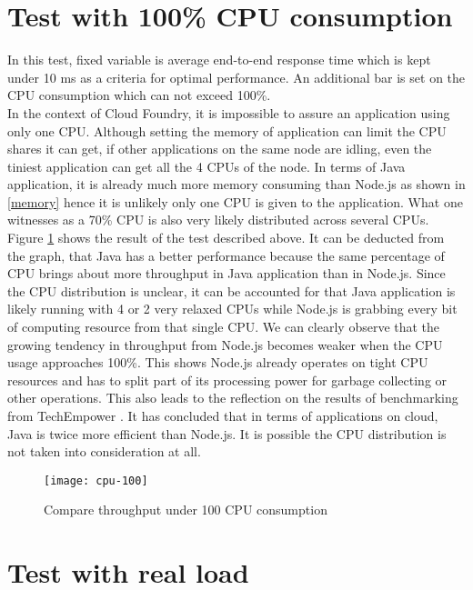 \section{Test with 100\% CPU consumption}
In this test, fixed variable is average end-to-end response time which is kept under 10 ms  as a criteria for optimal performance. An additional bar is set on the CPU consumption which can not exceed 100\%. \\
In the context of Cloud Foundry, it is impossible to assure an application using only one CPU. Although setting the memory of application can limit the CPU shares it can get, if other applications on the same node are idling, even the tiniest application can get all the 4 CPUs of the node. In terms of Java application, it is already much more memory consuming than Node.js as shown in \ref{memory} hence it is unlikely only one CPU is given to the application. What one witnesses as a 70\% CPU is also very likely distributed across several CPUs.\\
Figure \ref{cpu-100} shows the result of the test described above. It can be deducted from the graph, that Java has a better performance because the same percentage of CPU brings about more throughput in Java application than in Node.js. Since the CPU distribution is unclear, it can be accounted for that Java application is likely running with 4 or 2 very relaxed CPUs while Node.js is grabbing every bit of computing resource from that single CPU. We can clearly observe that the growing tendency in throughput from Node.js becomes weaker when the CPU usage approaches 100\%. This shows Node.js already operates on tight CPU resources and has to split part of its processing power for garbage collecting or other operations. This also leads to the reflection on the results of benchmarking from TechEmpower \citep{Benchmark}. It has concluded that in terms of applications on cloud, Java is twice more efficient than Node.js. It is possible the CPU distribution is not taken into consideration at all. 

\begin{figure}[h]
	\centering
	\texttt{[image: cpu-100]}
	\caption{Compare throughput under 100 CPU consumption}
	\label{cpu-100}
\end{figure}


\section{Test with real load}

